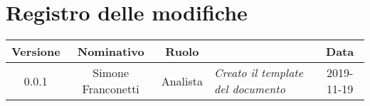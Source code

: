 \section*{Registro delle modifiche}
\renewcommand{\arraystretch}{1.8}

  \begin{longtable}{|c|c|c|p{3.8cm}|c|}
    \hline

    \rowcolor{header}
    \textbf{Versione} & \textbf{Nominativo} & \textbf{Ruolo} & \centering{\textbf{Descrizione}} & \textbf{Data}\\

    \hline

    0.0.1 & Simone Franconetti & Analista & \small{\textit{Creato il template del documento}} & 2019-11-19\\

    \hline
  \end{longtable}

